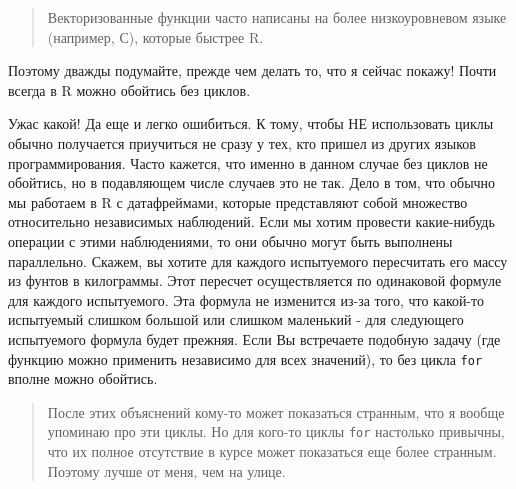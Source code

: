 \documentclass[]{book}
\newenvironment{Shaded}{\begin{snugshade}}{\end{snugshade}}
\newcommand{\KeywordTok}[1]{\textcolor[rgb]{0.13,0.29,0.53}{\textbf{#1}}}
\newcommand{\DecValTok}[1]{\textcolor[rgb]{0.00,0.00,0.81}{#1}}
\newcommand{\StringTok}[1]{\textcolor[rgb]{0.31,0.60,0.02}{#1}}
\newcommand{\CommentTok}[1]{\textcolor[rgb]{0.56,0.35,0.01}{\textit{#1}}}
\newcommand{\OtherTok}[1]{\textcolor[rgb]{0.56,0.35,0.01}{#1}}
\newcommand{\ControlFlowTok}[1]{\textcolor[rgb]{0.13,0.29,0.53}{\textbf{#1}}}
\newcommand{\OperatorTok}[1]{\textcolor[rgb]{0.81,0.36,0.00}{\textbf{#1}}}
\newcommand{\NormalTok}[1]{#1}
\begin{document}
\begin{quote}
Векторизованные функции часто написаны на более низкоуровневом языке
(например, С), которые быстрее R.
\end{quote}

Поэтому дважды подумайте, прежде чем делать то, что я сейчас покажу!
Почти всегда в R можно обойтись без циклов.

\begin{Shaded}
\end{Shaded}

Ужас какой! Да еще и легко ошибиться. К тому, чтобы НЕ использовать
циклы обычно получается приучиться не сразу у тех, кто пришел из других
языков программирования. Часто кажется, что именно в данном случае без
циклов не обойтись, но в подавляющем числе случаев это не так. Дело в
том, что обычно мы работаем в R с датафреймами, которые представляют
собой множество относительно независимых наблюдений. Если мы хотим
провести какие-нибудь операции с этими наблюдениями, то они обычно могут
быть выполнены параллельно. Скажем, вы хотите для каждого испытуемого
пересчитать его массу из фунтов в килограммы. Этот пересчет
осуществляется по одинаковой формуле для каждого испытуемого. Эта
формула не изменится из-за того, что какой-то испытуемый слишком большой
или слишком маленький - для следующего испытуемого формула будет
прежняя. Если Вы встречаете подобную задачу (где функцию можно применить
независимо для всех значений), то без цикла \texttt{for} вполне можно
обойтись.

\begin{quote}
После этих объяснений кому-то может показаться странным, что я вообще
упоминаю про эти циклы. Но для кого-то циклы \texttt{for} настолько
привычны, что их полное отсутствие в курсе может показаться еще более
странным. Поэтому лучше от меня, чем на улице.
\end{quote}
\end{document}
